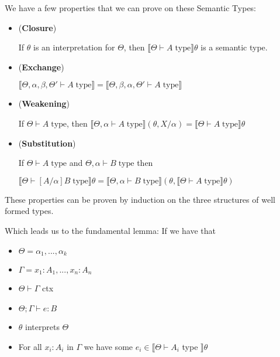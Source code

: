 \documentclass{article}
\begin{document}
\newpage
We have a few properties that we can prove on these Semantic Types:

\begin{itemize}
    \item (\textbf{Closure})
    
    If $\theta$ is an interpretation for $\Theta$, then $\llbracket \Theta \vdash A \; \textrm{type} \rrbracket \theta$ is a semantic type.
    
    \item (\textbf{Exchange})
    
    $\llbracket \Theta, \alpha, \beta, \Theta' \vdash A \; \textrm{type}\rrbracket = \llbracket \Theta, \beta, \alpha, \Theta' \vdash A \; \textrm{type}\rrbracket$
    
    \item (\textbf{Weakening})
    
    If $\Theta \vdash A \; \textrm{type}$, then $\llbracket \Theta, \alpha \vdash A \; \textrm{type}\rrbracket (\theta, X/\alpha) = \llbracket \Theta \vdash A \; \textrm{type}\rrbracket \theta$
    
    \item (\textbf{Substitution})
    
    If $\Theta \vdash A \; \textrm{type}$ and $\Theta, \alpha \vdash B \; \textrm{type}$ then 
    
    $\llbracket \Theta \vdash [A/\alpha ]B \; \textrm{type}\rrbracket \theta = \llbracket \Theta, \alpha \vdash B \; \textrm{type}\rrbracket (\theta, \llbracket \Theta \vdash A \; \textrm{type}\rrbracket \theta)$
\end{itemize}

These properties can be proven by induction on the three structures of well formed types.

Which leads us to the fundamental lemma: If we have that
\begin{itemize}
    \item $\Theta = \alpha_1, ..., \alpha_k$
    \item $\Gamma = x_1: A_1, ..., x_n: A_n$
    \item $\Theta \vdash \Gamma$ ctx
    \item $\Theta; \Gamma \vdash e : B$
    \item $\theta$ interprets $\Theta$
    \item For all $x_i: A_i$ in $\Gamma$ we have some $e_i \in \llbracket \Theta \vdash A_i$ type $\rrbracket \theta$
\end{itemize}
\end{document}
